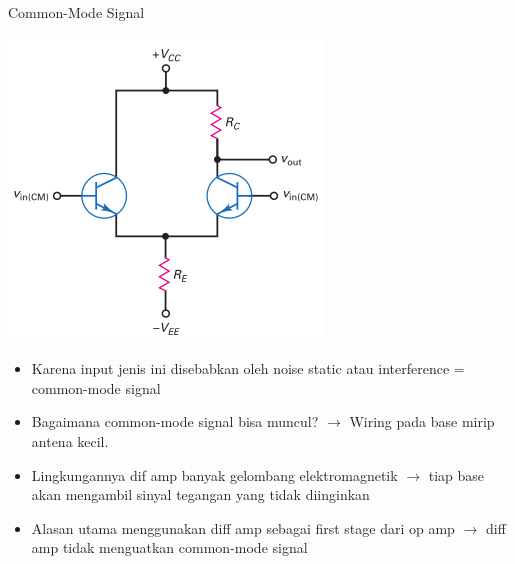 \documentclass[aspectratio=169]{beamer}
\begin{document}
\begin{frame}{Common-Mode Signal}
	\begin{multicols}{2}
		\begin{center}
			\includegraphics[height=0.7\textheight]{gambar/01.common-mode_input_signal}
		\end{center}
		\columnbreak
		\begin{itemize}
			\item Karena input jenis ini disebabkan oleh noise static atau interference = common-mode signal
			\item Bagaimana common-mode signal bisa muncul? $ \rightarrow $ Wiring pada base mirip antena kecil.
			\item Lingkungannya dif amp banyak gelombang elektromagnetik $ \rightarrow $ tiap base akan mengambil sinyal tegangan yang tidak diinginkan
			\item Alasan utama menggunakan diff amp sebagai first stage dari op amp $ \rightarrow $ diff amp tidak menguatkan common-mode signal
		\end{itemize}
	\end{multicols}
\end{frame}
\end{document}
